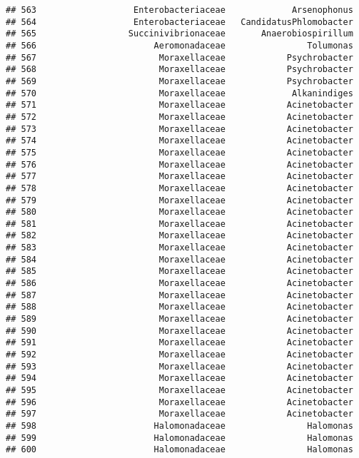 \documentclass[
]{article}
\begin{document}
\begin{verbatim}
## 563                   Enterobacteriaceae             Arsenophonus
## 564                   Enterobacteriaceae   CandidatusPhlomobacter
## 565                  Succinivibrionaceae       Anaerobiospirillum
## 566                       Aeromonadaceae                Tolumonas
## 567                        Moraxellaceae            Psychrobacter
## 568                        Moraxellaceae            Psychrobacter
## 569                        Moraxellaceae            Psychrobacter
## 570                        Moraxellaceae             Alkanindiges
## 571                        Moraxellaceae            Acinetobacter
## 572                        Moraxellaceae            Acinetobacter
## 573                        Moraxellaceae            Acinetobacter
## 574                        Moraxellaceae            Acinetobacter
## 575                        Moraxellaceae            Acinetobacter
## 576                        Moraxellaceae            Acinetobacter
## 577                        Moraxellaceae            Acinetobacter
## 578                        Moraxellaceae            Acinetobacter
## 579                        Moraxellaceae            Acinetobacter
## 580                        Moraxellaceae            Acinetobacter
## 581                        Moraxellaceae            Acinetobacter
## 582                        Moraxellaceae            Acinetobacter
## 583                        Moraxellaceae            Acinetobacter
## 584                        Moraxellaceae            Acinetobacter
## 585                        Moraxellaceae            Acinetobacter
## 586                        Moraxellaceae            Acinetobacter
## 587                        Moraxellaceae            Acinetobacter
## 588                        Moraxellaceae            Acinetobacter
## 589                        Moraxellaceae            Acinetobacter
## 590                        Moraxellaceae            Acinetobacter
## 591                        Moraxellaceae            Acinetobacter
## 592                        Moraxellaceae            Acinetobacter
## 593                        Moraxellaceae            Acinetobacter
## 594                        Moraxellaceae            Acinetobacter
## 595                        Moraxellaceae            Acinetobacter
## 596                        Moraxellaceae            Acinetobacter
## 597                        Moraxellaceae            Acinetobacter
## 598                       Halomonadaceae                Halomonas
## 599                       Halomonadaceae                Halomonas
## 600                       Halomonadaceae                Halomonas

\end{verbatim}
\end{document}
